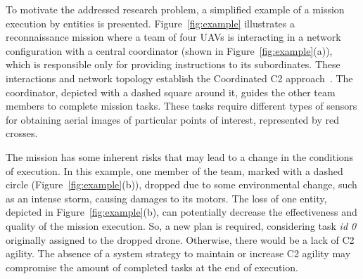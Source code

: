 



To motivate the addressed research problem, a simplified example of a mission execution by entities is presented. Figure~\ref{fig:example} illustrates a reconnaissance mission where a team of four UAVs is interacting in a network configuration with a central coordinator (shown in Figure~\ref{fig:example}(a)), which is responsible only for providing instructions to its subordinates. These interactions and network topology establish the Coordinated C2 approach~\citep{FRANCE2014}. The coordinator, depicted with a dashed square around it, guides the other team members to complete mission tasks. These tasks require different types of sensors for obtaining aerial images of particular points of interest, represented by red crosses.

The mission has some inherent risks that may lead to a change in the conditions of execution. In this example, one member of the team, marked with a dashed circle (Figure~\ref{fig:example}(b)), dropped due to some environmental change, such as an intense storm, causing damages to its motors. The loss of one entity, depicted in Figure~\ref{fig:example}(b), can potentially decrease the effectiveness and quality of the mission execution. So, a new plan is required, considering task \textit{id 0} originally assigned to the dropped drone. Otherwise, there would be a lack of C2 agility. The absence of a system strategy to maintain or increase C2 agility may compromise the amount of completed tasks at the end of execution. 


